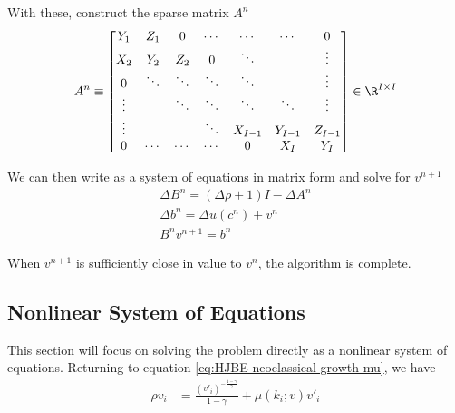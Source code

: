 \documentclass[11pt]{etk-article}
\begin{document}
With these, construct the sparse matrix $A^n$
\begin{align}
A^n &\equiv \begin{bmatrix}
Y_1 & Z_1 & 0 & \cdots & \cdots & \cdots & 0 \\
X_2 & Y_2 & Z_2 & 0 & \ddots& & \vdots \\
0 & \ddots & \ddots & \ddots & \ddots &  & \vdots \\
\vdots & &\ddots & \ddots & \ddots & \ddots  & \vdots \\
\vdots & & & \ddots & X_{I-1} & Y_{I-1}  & Z_{I-1} \\
0 & \cdots & \cdots & \cdots & 0 & X_I & Y_I\\
\end{bmatrix}\in\R^{I\times I}\label{eq:A}\\
\end{align}


We can then write as a system of equations in matrix form and solve for $v^{n+1}$
\begin{align}
\Delta B^n = (\Delta \rho + 1)I - \Delta A^n\\
\Delta b^n = \Delta u(c^n) + v^n\\
B^{n}v^{n+1}= {b^n}
\end{align}



When $v^{n+1}$ is sufficiently close in value to $v^n$, the algorithm is complete. 



\subsection{Nonlinear System of Equations}
This section will focus on solving the problem directly as a nonlinear system of equations. Returning to equation \cref{eq:HJBE-neoclassical-growth-mu}, we have 
\begin{align}
\rho v_i &= \frac{\left(v'_i\right)^{-\frac{1-\gamma}{\gamma}}}{1-\gamma} + \mu(k_i;v) v'_i
\end{align}



\end{document}
